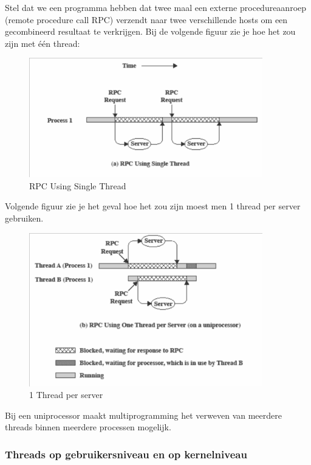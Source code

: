 Stel dat we een programma hebben dat twee maal een externe procedureaanroep (remote procedure call RPC) verzendt naar twee verschillende hosts om een gecombineerd resultaat te verkrijgen. Bij de volgende figuur zie je hoe het zou zijn met één thread:



\begin{figure}[htp]
    \centering
            \includegraphics[width=4in]{img/rpcsinglethread.png}
        \caption{RPC Using Single Thread}
    \label{fig:RPC Using Single Thread}
\end{figure}

\newpage

Volgende figuur zie je het geval hoe het zou zijn moest men 1 thread per server gebruiken.

\begin{figure}[htp]
    \centering
            \includegraphics[width=4in]{img/threadperserver.png}
        \caption{1 Thread per server}
    \label{fig:1 Thread per server}
\end{figure}

Bij een uniprocessor maakt multiprogramming het verweven van meerdere threads binnen meerdere processen mogelijk.

\subsubsection{Threads op gebruikersniveau en op kernelniveau}

